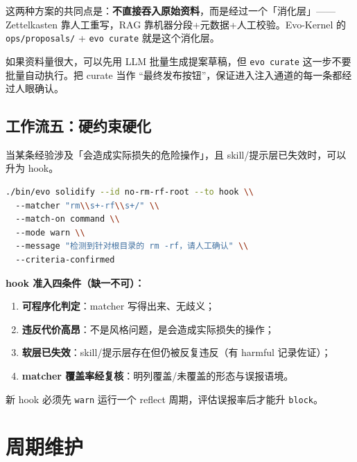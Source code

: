 \documentclass[12pt,a4paper]{ctexart}
\begin{document}
这两种方案的共同点是：\textbf{不直接吞入原始资料}，而是经过一个「消化层」——Zettelkasten 靠人工重写，RAG 靠机器分段+元数据+人工校验。Evo-Kernel 的 \texttt{ops/proposals/} + \texttt{evo curate} 就是这个消化层。

\begin{tipbox}
如果资料量很大，可以先用 LLM 批量生成提案草稿，但 \texttt{evo curate} 这一步不要批量自动执行。把 curate 当作 ``最终发布按钮''，保证进入注入通道的每一条都经过人眼确认。
\end{tipbox}

\subsection{工作流五：硬约束硬化}

当某条经验涉及「会造成实际损失的危险操作」，且 skill/提示层已失效时，可以升为 hook。

\begin{lstlisting}[language=bash]
./bin/evo solidify --id no-rm-rf-root --to hook \\
  --matcher "rm\\s+-rf\\s+/" \\
  --match-on command \\
  --mode warn \\
  --message "检测到针对根目录的 rm -rf，请人工确认" \\
  --criteria-confirmed
\end{lstlisting}

\begin{redbox}
\textbf{hook 准入四条件（缺一不可）：}
\begin{enumerate}
  \item \textbf{可程序化判定}：matcher 写得出来、无歧义；
  \item \textbf{违反代价高昂}：不是风格问题，是会造成实际损失的操作；
  \item \textbf{软层已失效}：skill/提示层存在但仍被反复违反（有 harmful 记录佐证）；
  \item \textbf{matcher 覆盖率经复核}：明列覆盖/未覆盖的形态与误报语境。
\end{enumerate}
新 hook 必须先 \texttt{warn} 运行一个 reflect 周期，评估误报率后才能升 \texttt{block}。
\end{redbox}

\section{周期维护}
\end{document}
